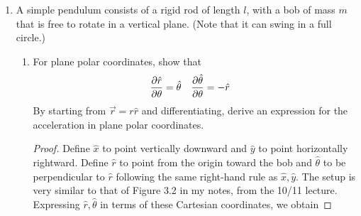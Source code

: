 \documentclass[../psets.tex]{subfiles}
\begin{document}
\begin{enumerate}
\begin{proof}
\begin{align*}
            \lambda(t) &= \frac{mg}{1+\alpha^2}
        \end{align*}
        Equipped with our undetermined multiplier, we can calculate the two components of the force of constraint as follows.
        \begin{align*}
            Q_1 &= \lambda\pdv{f}{x}&
                Q_2 &= \lambda\pdv{f}{y}\\
            Q_1 &= \frac{mg}{1+\alpha^2}\cdot\alpha&
                Q_2 &= \frac{mg}{1+\alpha^2}\cdot 1\\
            \Aboxed{Q_1 &= \frac{mg\alpha}{1+\alpha^2}}&
                \Aboxed{Q_2 &= \frac{mg}{1+\alpha^2}}\\
        \end{align*}
        To relate this force to the Newtonian normal force, we first investigate the latter. For a plane with slope $-\alpha=-\tan\theta$, a free body diagram tells us that the normal force $F_n=mg\cos\theta=mg/\sqrt{1+\alpha^2}$. Comparing this normal force equation to those of $Q_1,Q_2$ revelas that
        \begin{align*}
            \Aboxed{Q_1 &= F_n\sin\theta}&
            \Aboxed{Q_2 &= F_n\cos\theta}
        \end{align*}
        That is to say, $Q_1$ is the component of the normal force in the Cartesian $x$-direction and $Q_2$ is the component of the normal force in the Cartesian $y$-direction.
    \end{proof}
    \item A simple pendulum consists of a rigid rod of length $l$, with a bob of mass $m$ that is free to rotate in a vertical plane. (Note that it can swing in a full circle.)
    \begin{enumerate}
        \item For plane polar coordinates, show that
        \begin{align*}
            \pdv{\hat{r}}{\theta} &= \hat{\theta}&
            \pdv{\hat{\theta}}{\theta} &= -\hat{r}
        \end{align*}
        By starting from $\vec{r}=r\hat{r}$ and differentiating, derive an expression for the acceleration in plane polar coordinates.
        \begin{proof}
            Define $\hat{x}$ to point vertically downward and $\hat{y}$ to point horizontally rightward. Define $\hat{r}$ to point from the origin toward the bob and $\hat{\theta}$ to be perpendicular to $\hat{r}$ following the same right-hand rule as $\hat{x},\hat{y}$. The setup is very similar to that of Figure 3.2 in my notes, from the 10/11 lecture. Expressing $\hat{r},\hat{\theta}$ in terms of these Cartesian coordinates, we obtain

\end{proof}
\end{enumerate}
\end{enumerate}
\end{document}
